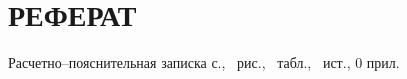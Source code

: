 \part*{РЕФЕРАТ}
\thispagestyle{empty}

Расчетно--пояснительная записка \pageref{LastPage} с., \totalfigures\ рис., \totaltables\ табл., \thetotalbibentries\ ист., 0 прил.	